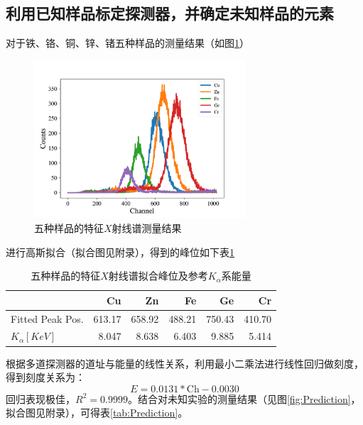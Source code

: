 \documentclass{article}
\begin{document}
    \subsection{利用已知样品标定探测器，并确定未知样品的元素}
    对于铁、铬、铜、锌、锗五种样品的测量结果（如图\ref{fig:Calibration}）
    \begin{figure}
        \centering
        \includegraphics[width=0.7\textwidth]{../plot/Calibration.pdf}
        \caption{五种样品的特征$X$射线谱测量结果\label{fig:Calibration}}
    \end{figure}
    进行高斯拟合（拟合图见附录），得到的峰位如下表\ref{tab:Calibration}
    \begin{table}[htbp]
        \centering
        \caption{五种样品的特征$X$射线谱拟合峰位及参考$K_\alpha$系能量\label{tab:Calibration}}
        \begin{tabular}{lrrrrr}
            \toprule
            {} &          Cu &          Zn &          Fe &          Ge &          Cr \\
            \midrule
            Fitted Peak Pos. &  613.17 &  658.92 &  488.21 &  750.43 &  410.70 \\
            $K_\alpha[\si{KeV}]$ &    8.047 &    8.638 &    6.403 &    9.885 &    5.414 \\
            \bottomrule
            \end{tabular}
    \end{table}
    根据多道探测器的道址与能量的线性关系，利用最小二乘法进行线性回归做刻度，得到刻度关系为：
    \begin{equation}
        E = 0.0131*\text{Ch} - 0.0030
    \end{equation}
    回归表现极佳，$R^2=0.9999$。结合对未知实验的测量结果（见图\ref{fig:Prediction}，拟合图见附录），可得表\ref{tab:Prediction}。
\end{document}
